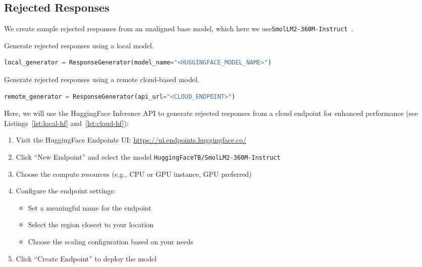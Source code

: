 \subsection{Rejected Responses}


We create sample rejected responses from an unaligned base model, which here we use\texttt{SmolLM2-360M-Instruct}~.

\begin{marginlisting}[1.35cm]
	\caption{Generate rejected responses using a local model.}
    \label{lst:local-hf}
	\vspace{0.6cm}
	\begin{lstlisting}[language=Python,style=kaolstplain]
local_generator = ResponseGenerator(model_name="<HUGGINGFACE_MODEL_NAME>")
	\end{lstlisting}
\end{marginlisting}
\begin{marginlisting}[1.35cm]
	\caption{Generate rejected responses using a remote cloud-based model.}
    \label{lst:cloud-hf}
	\vspace{0.6cm}
	\begin{lstlisting}[language=Python,style=kaolstplain]
        remote_generator = ResponseGenerator(api_url="<CLOUD_ENDPOINT>")
	\end{lstlisting}
\end{marginlisting}

Here, we will use the HuggingFace Inference API to generate rejected responses from a cloud endpoint for enhanced performance (see Listings~\ref{lst:local-hf} and~\ref{lst:cloud-hf}):
\begin{enumerate}
\item Visit the HuggingFace Endpoints UI: \url{https://ui.endpoints.huggingface.co/}
\item Click ``New Endpoint'' and select the model \texttt{HuggingFaceTB/SmolLM2-360M-Instruct}
\item Choose the compute resources (e.g., CPU or GPU instance, GPU preferred)
\item Configure the endpoint settings:
    \begin{itemize}
    \item Set a meaningful name for the endpoint
    \item Select the region closest to your location
    \item Choose the scaling configuration based on your needs
    \end{itemize}
\item Click ``Create Endpoint'' to deploy the model
\end{enumerate}

